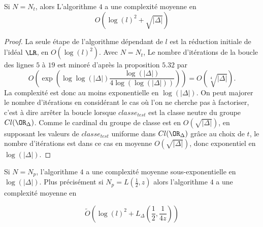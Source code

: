 \begin{Prop}
	
	Si $N = N_{t}$, alors L'algorithme $4$ a une complexité moyenne en 
	\begin{equation*}
		O(\log(l)^2 + \sqrt{|\Delta|})
	\end{equation*}
	
\end{Prop}

\begin{proof}
	La seule étape de l'algorithme dépendant de $l$ est la réduction initiale de l'idéal $\LR$, en $O(\log(l)^2)$. Avec $N = N_{t}$, Le nombre d'itérations de la boucle des lignes $5$ à $19$ est minoré d'après la proposition $5.32$ par
	\begin{equation*}
		O\left( \exp \left(  \log\log\left(|\Delta| \right)  \frac{\log\left(|\Delta| \right)}{4\log(\log(|\Delta|))} \right) \right) = O(\sqrt[4]{|\Delta|}).
	\end{equation*}
	La complexité est donc au moins exponentielle en $\log(|\Delta|)$. On peut majorer le nombre d'itérations en considérant le cas où l'on ne cherche pas à factoriser, c'est à dire arrêter la boucle lorsque $classe_{test}$ est la classe neutre du groupe $Cl(\OR_{\Delta})$. Comme le cardinal du groupe de classe est en $O(\sqrt{|\Delta|})$, en supposant les valeurs de $classe_{test}$ uniforme dans $Cl(\OR_{\Delta})$ grâce au choix de $t$, le nombre d'itérations est dans ce cas en moyenne $O(\sqrt{|\Delta|})$, donc exponentiel en $\log(|\Delta|)$. 
	
\end{proof}

\begin{Prop}
	 Si $N = N_{p}$, l'algorithme $4$ a une complexité moyenne sous-exponentielle en $\log(|\Delta|)$. Plus précisément si $N_{p} = L\left(\frac{1}{2}, z \right)$ alors l'algorithme $4$ a une complexité moyenne en
	 
	\begin{equation*}
		\tilde{O}\left(\log(l)^2 + L_\Delta\left(\frac{1}{2}, \frac{1}{4z} \right)\right)
	\end{equation*}
	
\end{Prop}

